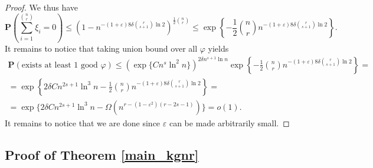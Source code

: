 \documentclass[10pt,a4paper]{article}
\theoremstyle{remark}
\theoremstyle{definition}
\newcommand{\mP}{\mathbf{P}}
\newcommand{\skob}[1]{\left(#1\right)}
\begin{document}
\begin{proof}
    We thus have
    $$
         \mP\skob{\sum_{i = 1}^{\binom{n}{r}}\xi_i = 0} \leq \skob{1 - n^{-(1+\varepsilon)8\delta\binom{r}{s+1}\ln 2}}^{\frac{1}{2}\binom{n}{r}} \leq \exp\left\{-\frac{1}{2}\binom{n}{r}n^{-(1+\varepsilon)8\delta\binom{r}{s+1}\ln 2}\right\}.
    $$
    It remains to notice that taking union bound over all $\varphi$ yields 
    \begin{multline*}
        \mP(\text{exists at least } 1 \text{ good } \varphi) \leq (\exp\{Cn^s\ln^2 n\})^{2\delta n^{s+1}\ln n}\exp\left\{-\frac{1}{2}\binom{n}{r}n^{-(1+\varepsilon)8\delta\binom{r}{s+1}\ln 2}\right\} = \\ = \exp\left\{2\delta Cn^{2s+1}\ln^3 n - \frac{1}{2}\binom{n}{r}n^{-(1+\varepsilon)8\delta\binom{r}{s+1}\ln 2}\right\} = \\ = \exp\{2\delta Cn^{2s+1}\ln^3 n - \Omega(n^{r-(1-\varepsilon^2)(r-2s-1)})\} = o(1).
    \end{multline*}
    It remains to notice that we are done since $\varepsilon$ can be made arbitrarily small.
\end{proof}

\subsection{Proof of Theorem \ref{main_kgnr}}
\end{document}

